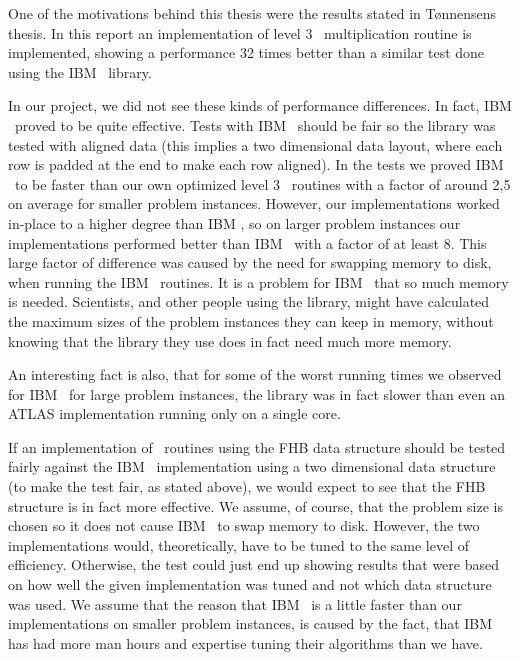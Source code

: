 One of the motivations behind this thesis were the results stated in
T{\o}nnensens thesis\cite{scipy}. In this report an implementation of
level 3 \BLAS\ multiplication routine is implemented, showing a
performance 32 times better than a similar test done using the
IBM \BLAS\ library.

In our project, we did not see these kinds of performance
differences. In fact, IBM \BLAS\ proved to be quite effective. Tests
with IBM \BLAS\ should be fair so the library was tested with aligned
data (this implies a two dimensional data layout, where each row is
padded at the end to make each row aligned). In the tests we proved
IBM \BLAS\ to be faster than our own optimized level 3 \BLAS\ routines
with a factor of around 2,5 on average for smaller problem
instances. However, our implementations worked in-place to a higher
degree than IBM \BLAS{}, so on larger problem instances our
implementations performed better than IBM \BLAS\ with a factor of at
least 8. This large factor of difference was caused by the need for
swapping memory to disk, when running the IBM \BLAS\ routines. It is a
problem for IBM \BLAS\ that so much memory is needed. Scientists, and
other people using the library, might have calculated the maximum
sizes of the problem instances they can keep in memory, without
knowing that the library they use does in fact need much more memory.

An interesting fact is also, that for some of the worst running times we observed for IBM \BLAS\ for large problem instances,
the library was in fact slower than even an ATLAS implementation running only on a single core.

If an implementation of \BLAS\ routines using the FHB data structure
should be tested fairly against the IBM \BLAS\ implementation using a
two dimensional data structure (to make the test fair, as stated
above), we would expect to see that the FHB structure is in fact more
effective. We assume, of course, that the problem size is chosen so
it does not cause IBM \BLAS\ to swap memory to disk. However, the two
implementations would, theoretically, have to be tuned to the same
level of efficiency. Otherwise, the test could just end up showing
results that were based on how well the given implementation was tuned
and not which data structure was used. We assume that the reason that
IBM \BLAS\ is a little faster than our implementations on smaller
problem instances, is caused by the fact, that IBM has had more man
hours and expertise tuning their algorithms than we have.

